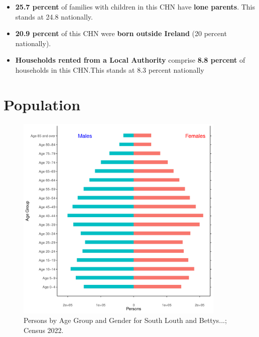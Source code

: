 \documentclass{article}
\begin{document}
\begin{itemize}
\item \textbf{25.7 percent} of families with children in this CHN have \textbf{lone parents}. This stands at 24.8 nationally.

\item \textbf{20.9 percent} of this CHN were \textbf{born outside Ireland} (20 percent nationally).

\item \textbf{Households rented from a Local Authority} comprise \textbf{8.8 percent} of households in this CHN.This stands at 8.3 percent nationally

\end{itemize}

\pagebreak

\section{Population} 
\label{sect:Pop}

\begin{figure}[h]
	\centering
	\includegraphics[width = 100mm]{../figures/PyramidPlot.pdf}
	\caption{Persons by Age Group and Gender for South Louth and Bettys...; Census 2022.}
	\label{fig:2ae19629-1a6a-13a3-e055-000000000001}
	\end{figure}
\end{document}
